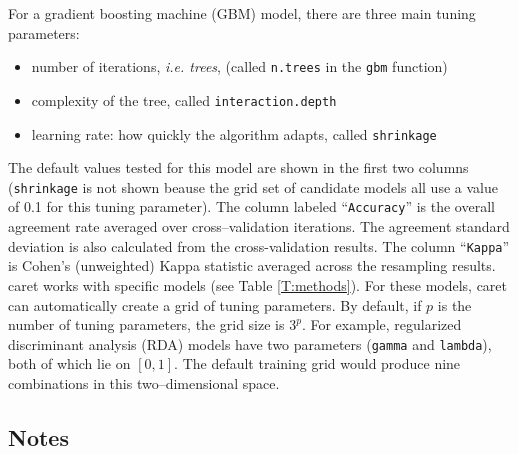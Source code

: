 \documentclass[12pt]{article}
\newcommand{\code}[1]{\mbox{\footnotesize\color{darkblue}\texttt{#1}}}
\newcommand{\pkg}[1]{{\fontseries{b}\selectfont #1}}
\renewcommand{\pkg}[1]{{\textsf{#1}}}
\begin{document}
For a gradient boosting machine (GBM) model, there are three main
tuning parameters:
\begin{itemize}
\item number of iterations,  {\it i.e. trees},  (called \code{n.trees} in the
  \code{gbm} function)
\item complexity of the tree, called \code{interaction.depth}
\item learning rate: how quickly the algorithm adapts, called
  \code{shrinkage} 
\end{itemize}
The default values tested for this model are shown in the first two
columns (\code{shrinkage} is not shown beause the grid set of
candidate models all use a value of 0.1 for this tuning parameter). 
The column labeled ``\code{Accuracy}'' is the overall agreement rate
averaged over cross--validation iterations. The agreement standard
deviation is also calculated from the cross-validation results. The
column ``\code{Kappa}'' is Cohen's (unweighted) Kappa statistic
averaged across the resampling results. \pkg{caret} works with specific models (see Table
\ref{T:methods}). For these models, \pkg{caret} can automatically
create a grid of tuning parameters. By default, if $p$ is the number
of tuning parameters, the grid size is $3^p$. For example, regularized
discriminant analysis (RDA) models have two  parameters
(\texttt{gamma} and \texttt{lambda}), both of which lie on $[0,
1]$. The default training grid would produce nine combinations in this
two--dimensional space. 


\subsection{Notes}
\end{document}
